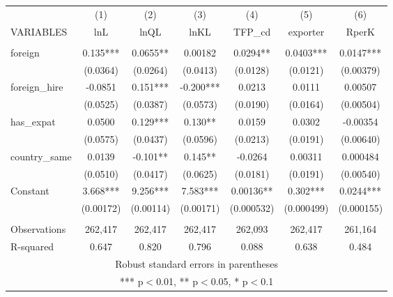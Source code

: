 \documentclass[]{article}
\begin{document}
\begin{tabular}{lcccccc} \hline
 & (1) & (2) & (3) & (4) & (5) & (6) \\
VARIABLES & lnL & lnQL & lnKL & TFP\_cd & exporter & RperK \\ \hline
 &  &  &  &  &  &  \\
foreign & 0.135*** & 0.0655** & 0.00182 & 0.0294** & 0.0403*** & 0.0147*** \\
 & (0.0364) & (0.0264) & (0.0413) & (0.0128) & (0.0121) & (0.00379) \\
foreign\_hire & -0.0851 & 0.151*** & -0.200*** & 0.0213 & 0.0111 & 0.00507 \\
 & (0.0525) & (0.0387) & (0.0573) & (0.0190) & (0.0164) & (0.00504) \\
has\_expat & 0.0500 & 0.129*** & 0.130** & 0.0159 & 0.0302 & -0.00354 \\
 & (0.0575) & (0.0437) & (0.0596) & (0.0213) & (0.0191) & (0.00640) \\
country\_same & 0.0139 & -0.101** & 0.145** & -0.0264 & 0.00311 & 0.000484 \\
 & (0.0510) & (0.0417) & (0.0625) & (0.0181) & (0.0191) & (0.00540) \\
Constant & 3.668*** & 9.256*** & 7.583*** & 0.00136** & 0.302*** & 0.0244*** \\
 & (0.00172) & (0.00114) & (0.00171) & (0.000532) & (0.000499) & (0.000155) \\
 &  &  &  &  &  &  \\
Observations & 262,417 & 262,417 & 262,417 & 262,093 & 262,417 & 261,164 \\
 R-squared & 0.647 & 0.820 & 0.796 & 0.088 & 0.638 & 0.484 \\ \hline
\multicolumn{7}{c}{ Robust standard errors in parentheses} \\
\multicolumn{7}{c}{ *** p$<$0.01, ** p$<$0.05, * p$<$0.1} \\
\end{tabular}
\end{document}

